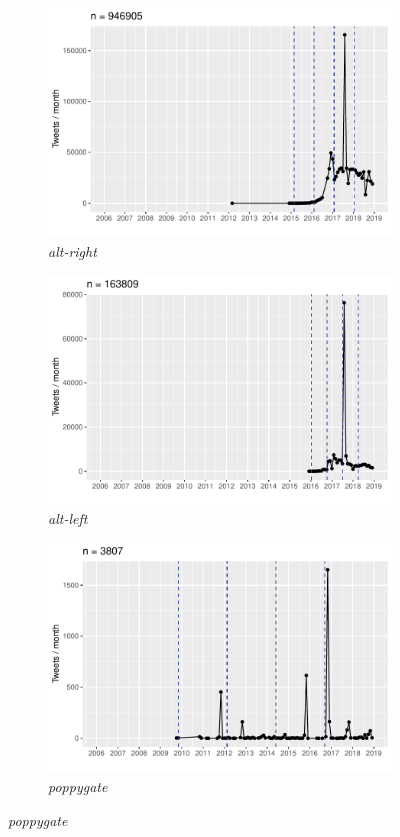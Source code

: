 \documentclass[
  a4paper,
  abstract=on,
  captions=tableabove
  ]{scrartcl}
\begin{document}
\begin{figure}
    \begin{subfigure}{.3\linewidth}
      \caption{\emph{alt-right}}
      \includegraphics[width=\linewidth, height=.8\textheight, keepaspectratio]{"img/ui_alt-right_time"}
    \end{subfigure}
    \begin{subfigure}{.3\linewidth}
      \caption{\emph{alt-left}}
      \includegraphics[width=\linewidth, height=.8\textheight, keepaspectratio]{"img/ui_alt-left_time.pdf"}
    \end{subfigure}
    \begin{subfigure}{.3\linewidth}
      \caption{\emph{poppygate}}
      \includegraphics[width=\linewidth, height=.8\textheight, keepaspectratio]{"img/ui_poppygate_time.pdf"}

\end{subfigure}
\end{figure}
\end{document}
